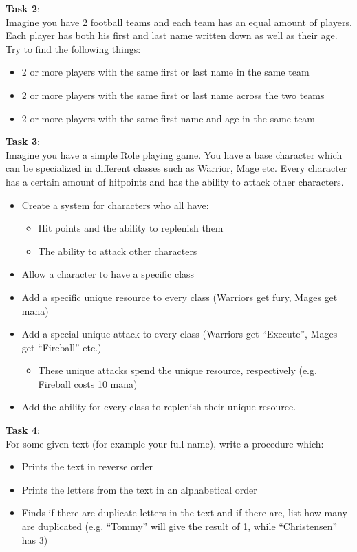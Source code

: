 \textbf{Task 2}:\\
Imagine you have 2 football teams and each team has an equal amount of players. Each player has both his first and last name written down as well as their age. Try to find the following things:
\begin{itemize}
\item 2 or more players with the same first or last name in the same team
\item 2 or more players with the same first or last name across the two teams
\item 2 or more players with the same first name and age in the same team
\end{itemize}

\textbf{Task 3}:\\
Imagine you have a simple Role playing game. You have a base character which can be specialized in different classes such as Warrior, Mage etc. Every character has a certain amount of hitpoints and has the ability to attack other characters. 
\begin{itemize}
\item Create a system for characters who all have:
\begin{itemize}
\item Hit points and the ability to replenish them
\item The ability to attack other characters
\end{itemize}
\item Allow a character to have a specific class
\item Add a specific unique resource to every class (Warriors get fury, Mages get mana)
\item Add a special unique attack to every class (Warriors get “Execute”, Mages get “Fireball” etc.)
\begin{itemize}
\item These unique attacks spend the unique resource, respectively (e.g. Fireball costs 10 mana) 
\end{itemize}
\item Add the ability for every class to replenish their unique resource.
\end{itemize}

\textbf{Task 4}:\\
For some given text (for example your full name), write a procedure which:
\begin{itemize}
\item Prints the text in reverse order
\item Prints the letters from the text in an alphabetical order
\item Finds if there are duplicate letters in the text and if there are, list how many are duplicated (e.g. “Tommy” will give the result of 1, while “Christensen” has 3) 
\end{itemize}